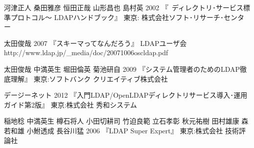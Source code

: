 \begin{thebibliography}{99}
\item
    河津正人 桑田雅彦 恒田正哉 山形昌也 島村英
    2002
    『~ディレクトリ･サービス標準プロトコル～ LDAPハンドブック』
    東京: 株式会社ソフト･リサーチ･センター
\item
    太田俊哉
    2007
    『スキーマってなんだろう』
    LDAPユーザ会
    http://www.ldap.jp/\_media/doc/20071006oscldap.pdf
\item
    太田俊哉 中満英生 堀田倫英 菊池研自
    2009
    『システム管理者のためのLDAP徹底理解』
    東京:ソフトバンク クリエイティブ株式会社
\item
    デージーネット
    2012
    『入門LDAP/OpenLDAPディレクトリサービス導入･運用ガイド第2版』
    東京:株式会社 秀和システム
\item
    稲地稔 中満英生 樽石将人 小田切耕司 竹迫良範 立石孝彰 秋元祐樹 田村雄康 森若和雄 小鮒透成 長谷川猛
    2006
    『LDAP Super Expert』
    東京:株式会社 技術評論社
\end{thebibliography}